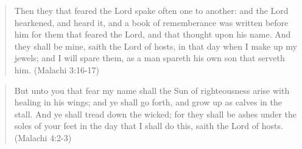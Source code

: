 \begin{quotation}
Then they that feared the Lord spake often one to another: and the Lord hearkened, and heard it, and a book of rememberance was written before him for them that feared the Lord, and that thought upon his name. And they shall be mine, saith the Lord of hosts, in that day when I make up my jewels; and I will spare them, as a man spareth his own son that serveth him. (Malachi 3:16-17)
\end{quotation}

\begin{quotation}
But unto you that fear my name shall the Sun of righteousness arise with healing in his wings; and ye shall go forth, and grow up as calves in the stall. And ye shall tread down the wicked; for they shall be ashes under the soles of your feet in the day that I shall do this, saith the Lord of hosts. (Malachi 4:2-3)
\end{quotation}
